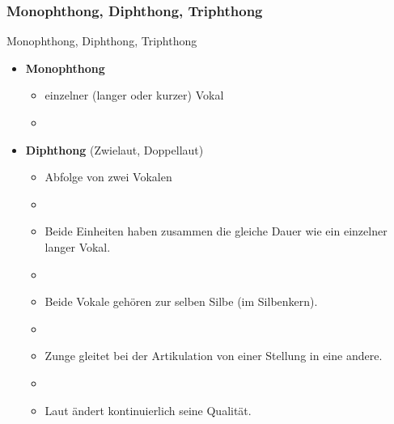 \subsubsection{Monophthong, Diphthong, Triphthong}

\begin{frame}{Monophthong, Diphthong, Triphthong}

\begin{itemize}
	\item \textbf{Monophthong}

	\begin{itemize}		
		\item einzelner (langer oder kurzer) Vokal
		\item[]
	\end{itemize}
	
	\item \textbf{Diphthong} (Zwielaut, Doppellaut)
	
	\begin{itemize}		
		\item Abfolge von zwei Vokalen
		\item[]
		\item Beide Einheiten haben zusammen die gleiche Dauer wie ein einzelner langer Vokal.
		\item[]
		\item Beide Vokale gehören zur selben Silbe (im Silbenkern).
		\item[]
		\item Zunge gleitet bei der Artikulation von einer Stellung in eine andere.
		\item[]
		\item Laut ändert kontinuierlich seine Qualität.
	\end{itemize}
	
\end{itemize}	

\end{frame}


